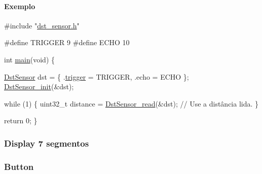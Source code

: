 \paragraph*{Exemplo}


\begin{DoxyCode}
\textcolor{preprocessor}{#include "\mbox{\hyperlink{dst__sensor_8h}{dst\_sensor.h}}"}

\textcolor{preprocessor}{#define TRIGGER 9}
\textcolor{preprocessor}{#define ECHO 10}

\textcolor{keywordtype}{int} \mbox{\hyperlink{main_8c_a840291bc02cba5474a4cb46a9b9566fe}{main}}(\textcolor{keywordtype}{void}) \{

  \mbox{\hyperlink{struct_dst_sensor}{DstSensor}} dst = \{ .\mbox{\hyperlink{struct_dst_sensor_ae328ec33ec4922371de944665ae70e32}{trigger}} = TRIGGER, .echo = ECHO \};
  \mbox{\hyperlink{dst__sensor_8c_a0b9337c7ac7811f15b47570565bbd914}{DstSensor\_init}}(&dst);

  \textcolor{keywordflow}{while} (1) \{
    uint32\_t distance = \mbox{\hyperlink{dst__sensor_8c_af201c139b62a0b1b36de3f03ddf4062f}{DstSensor\_read}}(&dst);
    \textcolor{comment}{// Use a distância lida.}
  \}

  \textcolor{keywordflow}{return} 0;
\}
\end{DoxyCode}


\subsubsection*{Display 7 segmentos}

\subsubsection*{Button}


